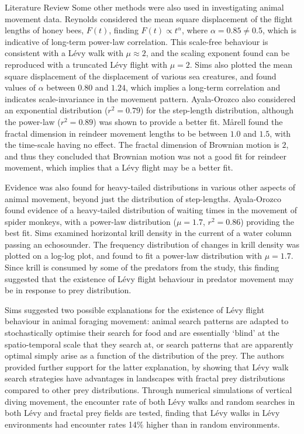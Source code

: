 \begin{section}{Literature Review \label{sec:litreview}}
Some other methods were also used in investigating animal movement data.
Reynolds \etal \cite{Reynolds_2007_bees} considered the mean square displacement of the flight lengths of honey bees, $F(t)$,  finding $F(t) \propto t^\alpha$, where $\alpha=0.85 \neq 0.5$, which is indicative of long-term power-law correlation.
This scale-free behaviour is consistent with a L\'{e}vy walk with $\mu \approx 2$, and the scaling exponent found can be reproduced with a truncated L\'{e}vy flight with $\mu = 2$.
Sims \etal \cite{Sims_2008} also plotted the mean square displacement of the displacement of various sea creatures, and found values of $\alpha$ between $0.80$ and $1.24$, which implies a long-term correlation and indicates scale-invariance in the movement pattern.
Ayala-Orozco \etal \cite{Ayala_Orozco_2004} also considered an exponential distribution ($r^2=0.79$) for the step-length distribution, although the power-law ($r^2=0.89$) was shown to provide a better fit.
Mårell \etal \cite{Marell_2002} found the fractal dimension in reindeer movement lengths to be between $1.0$ and $1.5$, with the time-scale having no effect.
The fractal dimension of Brownian motion is $2$, and thus they concluded that Brownian motion was not a good fit for reindeer movement, which implies that a L\'{e}vy flight may be a better fit.

Evidence was also found for heavy-tailed distributions in various other aspects of animal movement, beyond just the distribution of step-lengths.
Ayala-Orozco \etal \cite{Ayala_Orozco_2004} found evidence of a heavy-tailed distribution of waiting times in the movement of spider monkeys, with a power-law distribution ($\mu = 1.7$, $r^2 = 0.86$) providing the best fit.
Sims \etal \cite{Sims_2008} examined horizontal krill density in the current of a water column passing an echosounder.
The frequency distribution of changes in krill density was plotted on a log-log plot, and found to fit a power-law distribution with $\mu=1.7$.
Since krill is consumed by some of the predators from the study, this finding suggested that the existence of L\'{e}vy flight behaviour in predator movement may be in response to prey distribution. 

Sims \etal \cite{Sims_2008} suggested two possible explanations for the existence of L\'{e}vy flight behaviour in animal foraging movement: animal search patterns are adapted to stochastically optimise their search for food and are essentially `blind' at the spatio-temporal scale that they search at, or search patterns that are apparently optimal simply arise as a function of the distribution of the prey.
The authors provided further support for the latter explanation, by showing that L\'{e}vy walk search strategies have advantages in landscapes with fractal prey distributions compared to other prey distributions.
Through numerical simulations of vertical diving movement, the encounter rate of both L\'{e}vy walks and random searches in both L\'{e}vy and fractal prey fields are tested, finding that L\'{e}vy walks in L\'{e}vy environments had encounter rates 14\% higher than in random environments.


\end{section}
